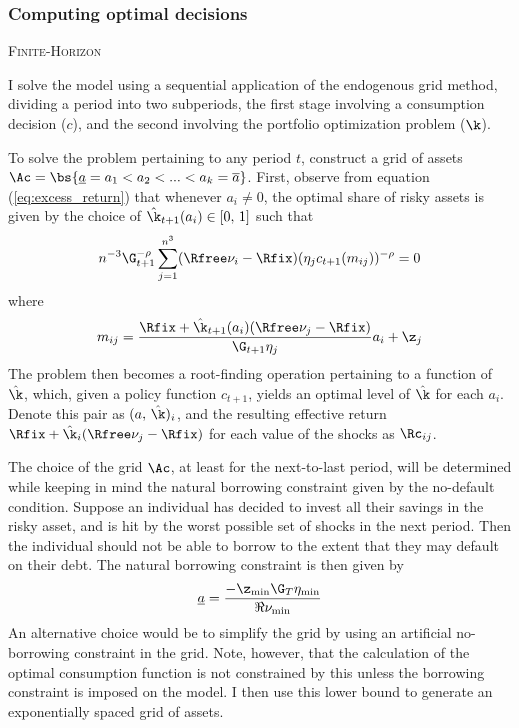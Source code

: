 \subsubsection{Computing optimal decisions}

\textsc{Finite-Horizon}

I solve the model using a sequential application of the endogenous grid method, dividing a period into two subperiods, the first stage involving a consumption decision ($c$), and the second involving the portfolio optimization problem ($\k$).

To solve the problem pertaining to any period $t$, construct a grid of assets $\Ac = \bs{\underline{a} = a_1 < a_2 < ... < a_k = \overline{a}}$. First, observe from equation (\ref{eq:excess_return}) that whenever $a_i \neq 0$, the optimal share of risky assets is given by the choice of $\hat{\k}_{t+1}(a_i) \in [0,\,1]$ such that
\begin{equation}\label{eq:kappa}
n^{-3}\G_{t+1}^{-\rho}\sum_{j=1}^{n^3}(\Rfree\nu_i - \Rfix)(\eta_{j}c_{t+1}(m_{ij}))^{-\rho} = 0
\end{equation}
where
\[
m_{ij} = \frac{\Rfix + \hat{\k}_{t+1}(a_i)(\Rfree\nu_j - \Rfix)}{\G_{t+1}\eta_{j}}a_i + \z_j
\]
The problem then becomes a root-finding operation pertaining to a function of $\hat{\k}$, which, given a policy function $c_{t+1}$, yields an optimal level of $\hat{\k}$ for each $a_i$. Denote this pair as $(a,\,\hat{\k})_{i}$, and the resulting effective return $\Rfix + \hat{\k}_{i}(\Rfree\nu_{j} - \Rfix)$ for each value of the shocks as $\Rc_{ij}$.

\begin{remark}
    The choice of the grid $\Ac$, at least for the next-to-last period, will be determined while keeping in mind the natural borrowing constraint given by the no-default condition. Suppose an individual has decided to invest all their savings in the risky asset, and is hit by the worst possible set of shocks in the next period. Then the individual should not be able to borrow to the extent that they may default on their debt. The natural borrowing constraint is then given by
    \[
    \underline{a} = \frac{-\z_{\min}\G_{T}\eta_{\min}}{\Re\nu_{\min}}
    \]
    An alternative choice would be to simplify the grid by using an artificial no-borrowing constraint in the grid. Note, however, that the calculation of the optimal consumption function is not constrained by this unless the borrowing constraint is imposed on the model. I then use this lower bound to generate an exponentially spaced grid of assets.
\end{remark}

